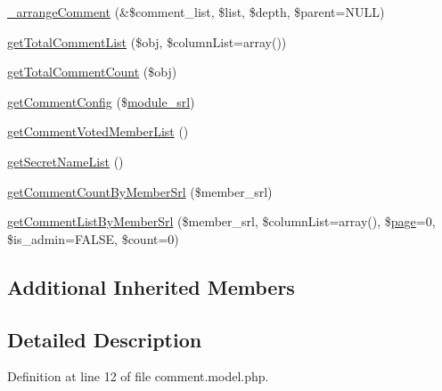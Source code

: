 \begin{DoxyCompactItemize}
\item 
\hyperlink{classcommentModel_a47ec9e90b14a5eb6108d22ab50b416d4}{\+\_\+arrange\+Comment} (\&\$comment\+\_\+list, \$list, \$depth, \$parent=N\+U\+L\+L)
\item 
\hyperlink{classcommentModel_abaac356ea7a0b2720034646c45b567ec}{get\+Total\+Comment\+List} (\$obj, \$column\+List=array())
\item 
\hyperlink{classcommentModel_a1854f15efa75a16e2edd603167d05e93}{get\+Total\+Comment\+Count} (\$obj)
\item 
\hyperlink{classcommentModel_a2e9bab595215a773f55c2400268d5bf6}{get\+Comment\+Config} (\$\hyperlink{ko_8install_8php_a370bb6450fab1da3e0ed9f484a38b761}{module\+\_\+srl})
\item 
\hyperlink{classcommentModel_a06f86d74df8aedbe4a4eba9704fd2d41}{get\+Comment\+Voted\+Member\+List} ()
\item 
\hyperlink{classcommentModel_ad05dafe1e96d761873a0b772eb1f749a}{get\+Secret\+Name\+List} ()
\item 
\hyperlink{classcommentModel_ad724212fb3664eeca8855af5d8944039}{get\+Comment\+Count\+By\+Member\+Srl} (\$member\+\_\+srl)
\item 
\hyperlink{classcommentModel_ac5582cb271f13874b4d60a7fafe1f5b7}{get\+Comment\+List\+By\+Member\+Srl} (\$member\+\_\+srl, \$column\+List=array(), \$\hyperlink{classpage}{page}=0, \$is\+\_\+admin=F\+A\+L\+S\+E, \$count=0)
\end{DoxyCompactItemize}
\subsection*{Additional Inherited Members}


\subsection{Detailed Description}


Definition at line 12 of file comment.\+model.\+php.



